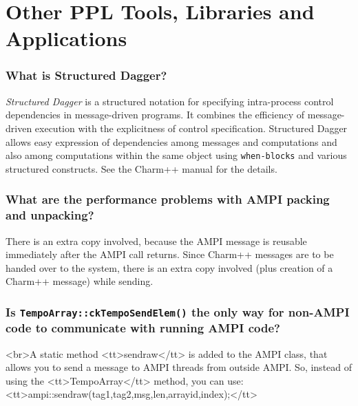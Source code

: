 \section{Other PPL Tools, Libraries and Applications}

\subsubsection{What is Structured Dagger?}

{\em Structured Dagger} is a structured notation for specifying intra-process
control dependencies in message-driven programs. It combines the efficiency
of message-driven execution with the explicitness of control specification.
Structured Dagger allows easy expression of dependencies among messages
and computations and also among computations within the same object using
{\tt when-blocks}
and various structured constructs. See the Charm++ manual for the details.

\subsubsection{What are the performance problems with AMPI packing and unpacking?}

There is an extra copy involved, because the AMPI message is reusable
immediately after the AMPI call returns. Since Charm++ messages are to
be handed over to the system, there is an extra copy involved (plus creation
of a Charm++ message) while sending.



\subsubsection{Is {\tt TempoArray::ckTempoSendElem()} the only way for non-AMPI
code to communicate with running AMPI code?}

<br>A static method <tt>sendraw</tt> is added to the AMPI class, that allows
you to send a message to AMPI threads from outside AMPI. So, instead of
using the <tt>TempoArray</tt> method, you can use:
<tt>ampi::sendraw(tag1,tag2,msg,len,arrayid,index);</tt>

